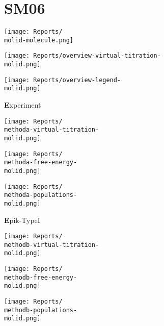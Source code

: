 \documentclass[9pt]{standalone}
\begin{document}
\newcommand{\molid}{SM06}
\newcommand{\methoda}{Experiment}
\newcommand{\methodb}{Epik-TypeI}
\newcommand{\methodc}{Jaguar-TypeI}
\newcommand{\methodd}{Epik-TypeII}
\newcommand{\methode}{Epik-TypeIII}
\section{\molid}
\noindent 
\begin{minipage}[s]{0.35\textwidth}\centering
\texttt{[image: Reports/\\molid-molecule.png]}
\end{minipage}
\begin{minipage}[s]{0.35\textwidth}
\texttt{[image: Reports/overview-virtual-titration-\\molid.png]}
\end{minipage}
\begin{minipage}[s]{0.23\textwidth}
\texttt{[image: Reports/overview-legend-\\molid.png]}
\end{minipage}

\begin{minipage}[s]{\textwidth}\centering
{\textbf \methoda}
\end{minipage}

\noindent
\begin{minipage}[s]{0.33\textwidth}\centering
\texttt{[image: Reports/\\methoda-virtual-titration-\\molid.png]}
\end{minipage}
\begin{minipage}[s]{0.33\textwidth}
\texttt{[image: Reports/\\methoda-free-energy-\\molid.png]}
\end{minipage}
\begin{minipage}[s]{0.33\textwidth}
\texttt{[image: Reports/\\methoda-populations-\\molid.png]}
\end{minipage}

\begin{minipage}[s]{\textwidth}\centering
{\textbf \methodb}
\end{minipage}

\noindent
\begin{minipage}[s]{0.33\textwidth}\centering
\texttt{[image: Reports/\\methodb-virtual-titration-\\molid.png]}
\end{minipage}
\begin{minipage}[s]{0.33\textwidth}
\texttt{[image: Reports/\\methodb-free-energy-\\molid.png]}
\end{minipage}
\begin{minipage}[s]{0.33\textwidth}
\texttt{[image: Reports/\\methodb-populations-\\molid.png]}
\end{minipage}
\end{document}

